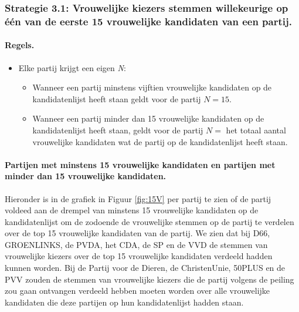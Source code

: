 \subsubsection{Strategie 3.1: Vrouwelijke kiezers stemmen willekeurige op één van de eerste 15 vrouwelijke kandidaten van een partij.}

\paragraph{Regels.}
\begin{itemize}
\item
Elke partij krijgt een eigen \textit{N}:
	\begin{itemize}
		\item
Wanneer een partij minstens vijftien vrouwelijke kandidaten op de kandidatenlijst heeft staan geldt voor de partij $N=15$.
		\item
Wanneer een partij minder dan 15 vrouwelijke kandidaten op de kandidatenlijst heeft staan, geldt voor de partij $N=$ het totaal aantal vrouwelijke kandidaten wat de partij op de kandidatenlijst heeft staan.\\
	\end{itemize}
\end{itemize}

\paragraph{Partijen met minstens 15 vrouwelijke kandidaten en partijen met minder dan 15 vrouwelijke kandidaten.}
Hieronder is in de grafiek in Figuur \ref{fig:15V} per partij te zien of de partij voldeed aan de drempel van minstens 15 vrouwelijke kandidaten op de kandidatenlijst om de zodoende de vrouwelijke stemmen op de partij te verdelen over de top 15 vrouwelijke kandidaten van de partij. We zien dat bij D66, GROENLINKS, de PVDA, het CDA, de SP en de VVD de stemmen van vrouwelijke kiezers over de top 15 vrouwelijke kandidaten verdeeld hadden kunnen worden. Bij de Partij voor de Dieren, de ChristenUnie, 50PLUS en de PVV zouden de stemmen van vrouwelijke kiezers die de partij volgens de peiling zou gaan ontvangen verdeeld hebben moeten worden over alle vrouwelijke kandidaten die deze partijen op hun kandidatenlijst hadden staan.


